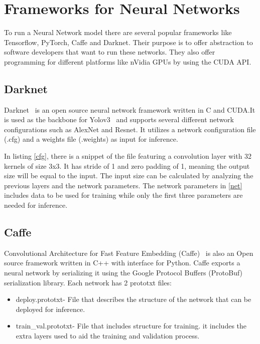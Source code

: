 
 \section{Frameworks for Neural Networks}
 \label{section:darknet}

\quad To run a Neural Network model there are several popular frameworks like Tensorflow, PyTorch, Caffe and Darknet.
Their purpose is to offer abstraction to software developers that want to run these networks. They also offer
programming for different platforms like nVidia GPUs by using the CUDA API.


\subsection{Darknet}

\quad Darknet~\cite{darknet} is an open source neural network framework written in C and CUDA.It is used as the backbone for Yolov3~\cite{yolov3} and supports several different network configurations such as AlexNet and Resnet.
 It utilizes a network configuration
file (.cfg) and a weights file (.weights) as input for inference.



In listing \ref{cfg}, there is a snippet of the file featuring
a convolution layer with 32 kernels of size 3x3. It has stride of 1 and zero padding of 1, meaning the output size will
be equal to the input. The input size can be calculated by analyzing the previous layers and the network parameters. The network parameters in \ref{net} includes
data to be used for training while only the first three parameters are needed for inference.




\subsection{Caffe}


\quad Convolutional Architecture for Fast Feature Embedding (Caffe)~\cite{caffe} is also an Open source framework written in C++ with interface for Python.
Caffe exports a neural network by serializing it using the Google Protocol Buffers (ProtoBuf) serialization library. Each network has 2 prototxt files:
\begin{itemize}
    \item  deploy.prototxt- File that describes the structure of the network that can be deployed for inference.
    \item  train\_val.prototxt- File that includes structure for training. 
    it includes the extra layers used to aid the training and validation process.
\end{itemize}

